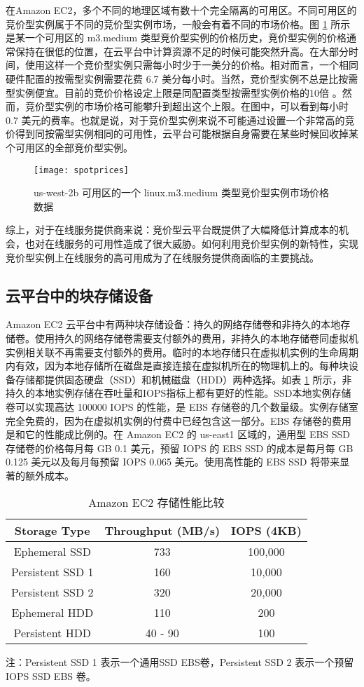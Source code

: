 在Amazon EC2，多个不同的地理区域有数十个完全隔离的可用区。不同可用区的竞价型实例属于不同的竞价型实例市场，一般会有着不同的市场价格。图 \ref{figure:sp} 所示是某一个可用区的 m3.medium 类型竞价型实例的价格历史，竞价型实例的价格通常保持在很低的位置，在云平台中计算资源不足的时候可能突然升高。在大部分时间，使用这样一个竞价型实例只需每小时少于一美分的价格。相对而言，一个相同硬件配置的按需型实例需要花费 6.7 美分每小时。当然，竞价型实例不总是比按需型实例便宜。目前的竞价价格设定上限是同配置类型按需型实例价格的10倍 \cite{AWS_SL:2014}。然而，竞价型实例的市场价格可能攀升到超出这个上限。在图中，可以看到每小时 0.7 美元的费率。也就是说，对于竞价型实例来说不可能通过设置一个非常高的竞价得到同按需型实例相同的可用性，云平台可能根据自身需要在某些时候回收掉某个可用区的全部竞价型实例。
\begin{figure}[]
  \centering
  \texttt{[image: spotprices]}
  \caption{us-west-2b 可用区的一个 linux.m3.medium 类型竞价型实例市场价格数据}
  \label{figure:sp}
\end{figure}

综上，对于在线服务提供商来说：竞价型云平台既提供了大幅降低计算成本的机会，也对在线服务的可用性造成了很大威胁。如何利用竞价型实例的新特性，实现竞价型实例上在线服务的高可用成为了在线服务提供商面临的主要挑战。

\subsection{云平台中的块存储设备}
Amazon EC2 云平台中有两种块存储设备：持久的网络存储卷和非持久的本地存储卷。使用持久的网络存储卷需要支付额外的费用，非持久的本地存储卷同虚拟机实例相关联不再需要支付额外的费用。临时的本地存储只在虚拟机实例的生命周期内有效，因为本地存储所在磁盘是直接连接在虚拟机所在的物理机上的。每种块设备存储都提供固态硬盘（SSD）和机械磁盘（HDD）两种选择。如表 \ref{table:ec2storage} 所示，非持久的本地实例存储在吞吐量和IOPS指标上都有更好的性能。SSD本地实例存储卷可以实现高达 100000 IOPS 的性能，是 EBS 存储卷的几个数量级。实例存储室完全免费的，因为在虚拟机实例的付费中已经包含这一部分。EBS 存储卷的费用是和它的性能成比例的。在 Amazon EC2 的 us-east1 区域的，通用型 EBS SSD 存储卷的价格每月每 GB 0.1 美元，预留 IOPS 的 EBS SSD 的成本是每月每 GB 0.125 美元以及每月每预留 IOPS 0.065 美元。使用高性能的 EBS SSD 将带来显著的额外成本。
\begin{table}
\centering
\begin{threeparttable}
\caption{Amazon EC2 存储性能比较}
\label{table:ec2storage}
\begin{tabular}{c|c|c} \hline
Storage Type& Throughput (MB/s)& IOPS (4KB)\\
\hline
Ephemeral SSD & 733 & 100,000\\
Persistent SSD 1 & 160 & 10,000\\
Persistent SSD 2 & 320 & 20,000\\
Ephemeral HDD & 110 & 200 \\
Persistent HDD & 40 - 90 & 100\\
\hline
\end{tabular}
\small 注：Persistent SSD 1 表示一个通用SSD EBS卷，Persistent SSD 2 表示一个预留 IOPS SSD EBS 卷。 
\end{threeparttable}
\end{table}

